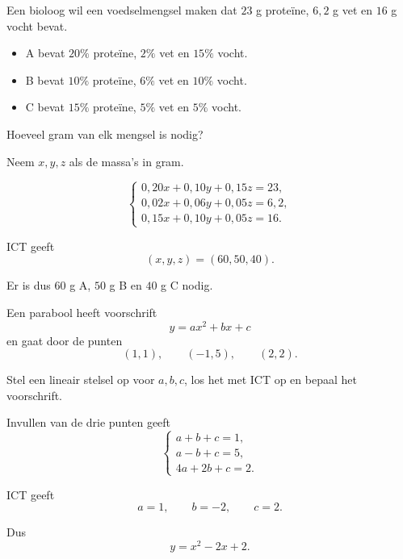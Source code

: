 \documentclass{ximera}
\begin{document}
\begin{oefening}[Voedingsmengsel]{\oefB\ESS}

Een bioloog wil een voedselmengsel maken dat \(23\) g proteïne,
\(6{,}2\) g vet en \(16\) g vocht bevat.

\begin{itemize}
  \item A bevat \(20\%\) proteïne, \(2\%\) vet en \(15\%\) vocht.
  \item B bevat \(10\%\) proteïne, \(6\%\) vet en \(10\%\) vocht.
  \item C bevat \(15\%\) proteïne, \(5\%\) vet en \(5\%\) vocht.
\end{itemize}

Hoeveel gram van elk mengsel is nodig?

\begin{oplossing}
Neem \(x,y,z\) als de massa's in gram.

\[
\begin{cases}
0{,}20x+0{,}10y+0{,}15z=23,\\
0{,}02x+0{,}06y+0{,}05z=6{,}2,\\
0{,}15x+0{,}10y+0{,}05z=16.
\end{cases}
\]

ICT geeft
\[
(x,y,z)=(60,50,40).
\]

Er is dus \(60\) g A, \(50\) g B en \(40\) g C nodig.
\end{oplossing}
\end{oefening}


\begin{oefening}{\oefB\ESS}

Een parabool heeft voorschrift
\[
y=ax^2+bx+c
\]
en gaat door de punten
\[
(1,1),\qquad (-1,5),\qquad (2,2).
\]

Stel een lineair stelsel op voor \(a,b,c\), los het met ICT op en bepaal
het voorschrift.

\begin{oplossing}
Invullen van de drie punten geeft
\[
\begin{cases}
a+b+c=1,\\
a-b+c=5,\\
4a+2b+c=2.
\end{cases}
\]

ICT geeft
\[
a=1,\qquad b=-2,\qquad c=2.
\]

Dus
\[
\boxed{y=x^2-2x+2}.
\]
\end{oplossing}
\end{oefening}
\end{document}
